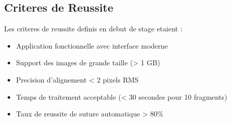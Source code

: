 \documentclass[12pt,a4paper]{article}
\begin{document}
\subsection{Criteres de Reussite}

Les criteres de reussite definis en debut de stage etaient :
\begin{itemize}
\item Application fonctionnelle avec interface moderne
\item Support des images de grande taille (> 1 GB)
\item Precision d'alignement < 2 pixels RMS
\item Temps de traitement acceptable (< 30 secondes pour 10 fragments)
\item Taux de reussite de suture automatique > 80\%
\end{itemize}
\end{document}
